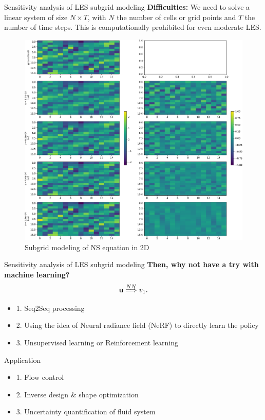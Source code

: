 \documentclass[NUS-Kajima workshop]{beamer}
\begin{document}
\begin{frame}{Sensitivity analysis of LES subgrid modeling}
	\textbf{Difficulties: } We need to solve a linear system of size $N \times T$, with $N$ the number of cells or grid points and $T$ the 
	number of time steps. This is computationally prohibited for even moderate LES.
	\begin{figure}[H]
		\centering
		\centerline{\includegraphics[width=.55\linewidth]{fig/ns-lss-cloudmap.pdf}}
		\caption{Subgrid modeling of NS equation in 2D}
\end{figure}
\end{frame}

\begin{frame}{Sensitivity analysis of LES subgrid modeling}
	\textbf{Then, why not have a try with machine learning?}
	\begin{equation}
		\mathbf{u} \overset{NN}{\Longrightarrow} v_1.
	\end{equation}
	\begin{itemize}
		\item 1. Seq2Seq processing
		\item 2. Using the idea of Neural radiance field (NeRF) to directly learn the policy
		\item 3. Unsupervised learning or Reinforcement learning
	\end{itemize}
\end{frame}

\begin{frame}{Application}
	\begin{itemize}
		\item 1. Flow control
		\item 2. Inverse design \& shape optimization
		\item 3. Uncertainty quantification of fluid system
	\end{itemize}
\end{frame}
\end{document}
